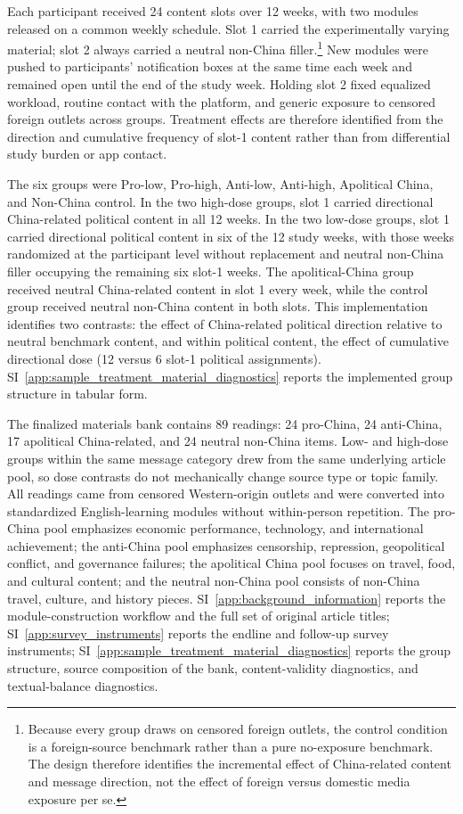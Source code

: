 \documentclass[12pt,american]{article}
\begin{document}
Each participant received 24 content slots over 12 weeks, with two modules released on a common weekly schedule. Slot 1 carried the experimentally varying material; slot 2 always carried a neutral non-China filler.\footnote{Because every group draws on censored foreign outlets, the control condition is a foreign-source benchmark rather than a pure no-exposure benchmark. The design therefore identifies the incremental effect of China-related content and message direction, not the effect of foreign versus domestic media exposure per se.} New modules were pushed to participants' notification boxes at the same time each week and remained open until the end of the study week. Holding slot 2 fixed equalized workload, routine contact with the platform, and generic exposure to censored foreign outlets across groups. Treatment effects are therefore identified from the direction and cumulative frequency of slot-1 content rather than from differential study burden or app contact.

The six groups were Pro-low, Pro-high, Anti-low, Anti-high, Apolitical China, and Non-China control. In the two high-dose groups, slot 1 carried directional China-related political content in all 12 weeks. In the two low-dose groups, slot 1 carried directional political content in six of the 12 study weeks, with those weeks randomized at the participant level without replacement and neutral non-China filler occupying the remaining six slot-1 weeks. The apolitical-China group received neutral China-related content in slot 1 every week, while the control group received neutral non-China content in both slots. This implementation identifies two contrasts: the effect of China-related political direction relative to neutral benchmark content, and within political content, the effect of cumulative directional dose (12 versus 6 slot-1 political assignments). SI~\ref{app:sample_treatment_material_diagnostics} reports the implemented group structure in tabular form.

The finalized materials bank contains 89 readings: 24 pro-China, 24 anti-China, 17 apolitical China-related, and 24 neutral non-China items. Low- and high-dose groups within the same message category drew from the same underlying article pool, so dose contrasts do not mechanically change source type or topic family. All readings came from censored Western-origin outlets and were converted into standardized English-learning modules without within-person repetition. The pro-China pool emphasizes economic performance, technology, and international achievement; the anti-China pool emphasizes censorship, repression, geopolitical conflict, and governance failures; the apolitical China pool focuses on travel, food, and cultural content; and the neutral non-China pool consists of non-China travel, culture, and history pieces. SI~\ref{app:background_information} reports the module-construction workflow and the full set of original article titles; SI~\ref{app:survey_instruments} reports the endline and follow-up survey instruments; SI~\ref{app:sample_treatment_material_diagnostics} reports the group structure, source composition of the bank, content-validity diagnostics, and textual-balance diagnostics.
	
\end{document}
